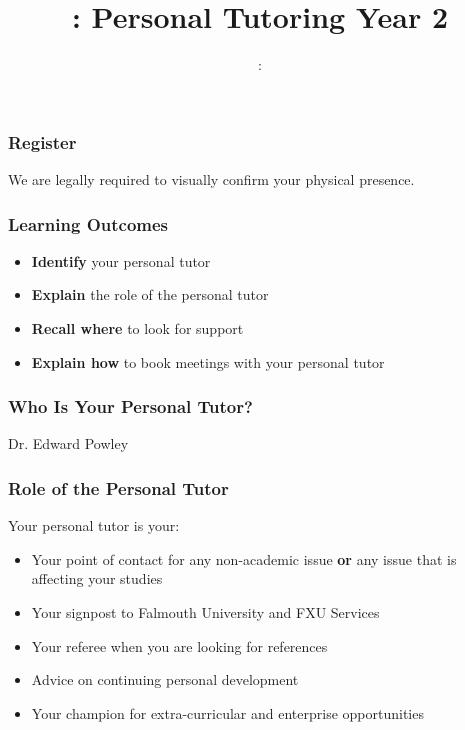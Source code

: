 \usepackage[T1]{fontenc}
\usepackage{../../beamerthemeFalmouthGamesAcademy}
\usepackage{multimedia}
\graphicspath{ {../../} }


\usepackage[normalem]{ulem}
\usepackage{wasysym}

\usepackage{pdfpages}

\usetikzlibrary{arrows,automata}




\title{\sessionnumber: Personal Tutoring Year 2}
\subtitle{\modulecode: \moduletitle}

\frame{\titlepage} 

\begin{frame}
	\frametitle{Register}
	
	We are legally required to visually confirm your physical presence.
	
\end{frame}

\begin{frame}
	\frametitle{Learning Outcomes}
	\begin{itemize}
		\item \textbf{Identify} your personal tutor
		\item \textbf{Explain} the role of the personal tutor
		\item \textbf{Recall where} to look for support
		\item \textbf{Explain how} to book meetings with your personal tutor
	\end{itemize}
\end{frame}

\begin{frame}
	\frametitle{Who Is Your Personal Tutor?}
	\begin{center}
		Dr. Edward Powley
	\end{center}
\end{frame}

\begin{frame}
	\frametitle{Role of the Personal Tutor}	
	
	Your personal tutor is your:
	
	\begin{itemize}
		\item Your point of contact for any non-academic issue \textbf{or} any issue that is affecting your studies
		\item Your signpost to Falmouth University and FXU Services
		\item Your referee when you are looking for references
		\item Advice on continuing personal development
		\item Your champion for extra-curricular and enterprise opportunities 
	\end{itemize}
\end{frame}

